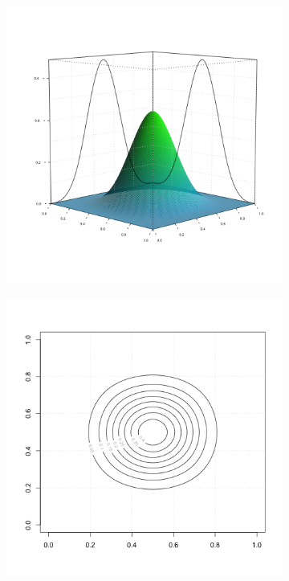 \begin{figure}[H]
  \caption{\textit{ Tensor product of two cubic B-splines }}\label{fig:bicubic-bspline-function}
    \begin{center}
 \begin{subfigure}[t]{0.48\textwidth}
  \centering
  \includegraphics[width=\textwidth]{img/bicubic_basis_function}
  \end{subfigure}
 \begin{subfigure}[t]{.48\textwidth}
  \centering
\includegraphics[width=\textwidth]{img/bicubic_bspline_contour}
 \end{subfigure}
 \end{center}
\end{figure}



